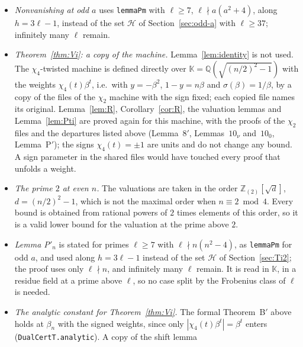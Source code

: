\documentclass[11pt]{amsart}
\theoremstyle{definition}
\theoremstyle{remark}
\numberwithin{equation}{section}
\newcommand{\ZZ}{\mathbb{Z}}
\newcommand{\QQ}{\mathbb{Q}}
\newcommand{\KK}{\mathbb{K}}
\newcommand{\cE}{\mathcal{E}}
\newcommand{\lean}[1]{{\def\_{\textunderscore\allowbreak}\texttt{#1}}}
\begin{document}
\begin{itemize}
  formal proof splits off the primes $3$, $5$, $7$ in $\sum_{p^e\parallel a}c_p(e)$, which gives a closed form negative
  for every odd $a\ge275$, and checks the $96$ odd $a<275$ outside $\cE_{\mathrm{odd}}$ one by one, with rational
  enclosures of the logarithms. Only the ``if'' part of Proposition~\ref{prop:marginsodd} is formalised; the ``only if''
  part is not needed for Theorem~\ref{thm:Vodd}.
\item \emph{Nonvanishing at odd $a$} uses \lean{lemmaP\_m} with $\ell\ge7$, $\ell\nmid a(a^2+4)$, along $h=3\ell-1$,
  instead of the set $\mathcal H$ of Section~\ref{sec:odd-a} with $\ell\ge37$; infinitely many $\ell$ remain.
\item \emph{Theorem~\ref{thm:Vi}: a copy of the machine.} Lemma~\ref{lem:identity} is not used. The $\chi_4$-twisted
  machine is defined directly over $\KK=\QQ(\sqrt{(n/2)^2-1})$ with the weights $\chi_4(t)\beta^t$, i.e.\ with $y=-\beta^2$,
  $1-y=n\beta$ and $\sigma(\beta)=1/\beta$, by a copy of the files of the $\chi_2$ machine with the sign fixed; each copied
  file names its original. Lemma~\ref{lem:R}, Corollary~\ref{cor:R}, the valuation lemmas and Lemma~\ref{lem:Pti} are
  proved again for this machine, with the proofs of the $\chi_2$ files and the departures listed above (Lemma~$8'$,
  Lemmas~$10_\nu$ and~$10_0$, Lemma~P$'$); the signs $\chi_4(t)=\pm1$ are units and do not change any bound. A sign
  parameter in the shared files would have touched every proof that unfolds a weight.
\item \emph{The prime $2$ at even $n$.} The valuations are taken in the order $\ZZ_{(2)}[\sqrt{d}]$, $d=(n/2)^2-1$,
  which is not the maximal order when $n\equiv2\bmod4$. Every bound is obtained from rational powers of $2$ times
  elements of this order, so it is a valid lower bound for the valuation at the prime above $2$.
\item \emph{Lemma P$'_n$} is stated for primes $\ell\ge7$ with $\ell\nmid n(n^2-4)$, as \lean{lemmaP\_m} for odd $a$,
  and used along $h=3\ell-1$ instead of the set $\mathcal H$ of Section~\ref{sec:Ti2}; the proof uses only $\ell\nmid n$,
  and infinitely many $\ell$ remain. It is read in $\KK$, in a residue field at a prime above $\ell$, so no case split by
  the Frobenius class of $\ell$ is needed.
\item \emph{The analytic constant for Theorem~\ref{thm:Vi}.} The formal Theorem~B$'$ above holds at $\beta_n$ with the
  signed weights, since only $|\chi_4(t)\beta^t|=\beta^t$ enters (\lean{DualCertT.analytic}). A copy of the shift lemma

\end{itemize}
\end{document}
